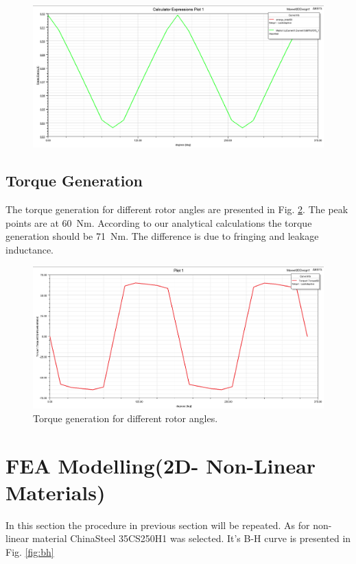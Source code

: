\documentclass{article}
\begin{document}
\begin{figure}[H]
	\centering
	\includegraphics[width=1\linewidth]{Figurler/Q2/total_energy}
	\caption{}
	\label{fig:totalenergy}
\end{figure}

\subsection{Torque Generation}
The torque generation for different rotor angles are presented in Fig. \ref{fig:degreestorque}. The peak points are at 60~Nm. According to our analytical calculations the torque generation should be 71~Nm. The difference is due to fringing and leakage inductance.  
\begin{figure}[H]
	\centering
	\includegraphics[width=1\linewidth]{Figurler/Q2/degrees_torque}
	\caption{Torque generation for different rotor angles.}
	\label{fig:degreestorque}
\end{figure}


\section{FEA Modelling(2D- Non-Linear Materials)}
In this section the procedure in previous section will be repeated. As for non-linear material ChinaSteel 35CS250H1 was selected. It's B-H curve is presented in Fig. \ref{fig:bh}
\end{document}
